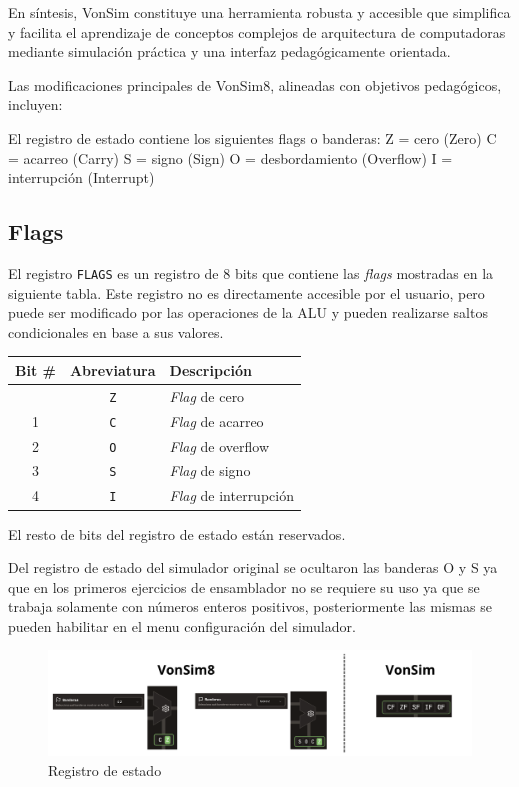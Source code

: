 \documentclass[12pt,oneside]{templates/unerthesis}
\begin{document}
En síntesis, VonSim constituye una herramienta robusta y accesible que simplifica y facilita el aprendizaje de conceptos complejos de arquitectura de computadoras mediante simulación práctica y una interfaz pedagógicamente orientada.

Las modificaciones principales de VonSim8, alineadas con objetivos pedagógicos, incluyen:

El registro de estado contiene los siguientes flags o banderas:
Z = cero (Zero)
C = acarreo (Carry)
S = signo (Sign)
O = desbordamiento (Overflow)
I = interrupción (Interrupt)

\hypertarget{flags}{%
\subsection{Flags}\label{flags}}

El registro \texttt{FLAGS} es un registro de 8 bits que contiene las \emph{flags} mostradas en la siguiente tabla. Este registro no es directamente accesible por el usuario, pero puede ser modificado por las operaciones de la ALU y pueden realizarse saltos condicionales en base a sus valores.

\begin{longtable}[]{@{}ccl@{}}
\toprule\noalign{}
Bit \# & Abreviatura & Descripción \\
\midrule\noalign{}
\endhead
\bottomrule\noalign{}
\endlastfoot
0 & \texttt{Z} & \emph{Flag} de cero \\
1 & \texttt{C} & \emph{Flag} de acarreo \\
2 & \texttt{O} & \emph{Flag} de overflow \\
3 & \texttt{S} & \emph{Flag} de signo \\
4 & \texttt{I} & \emph{Flag} de interrupción \\
\end{longtable}

El resto de bits del registro de estado están reservados.

Del registro de estado del simulador original se ocultaron las banderas O y S ya que en los primeros ejercicios de ensamblador no se requiere su uso ya que se trabaja solamente con números enteros positivos, posteriormente las mismas se pueden habilitar en el menu configuración del simulador.

\begin{figure}

{\centering \includegraphics[width=0.85\linewidth]{images/flags} 

}

\caption{Registro de estado}\label{fig:banderas}
\end{figure}
\end{document}
